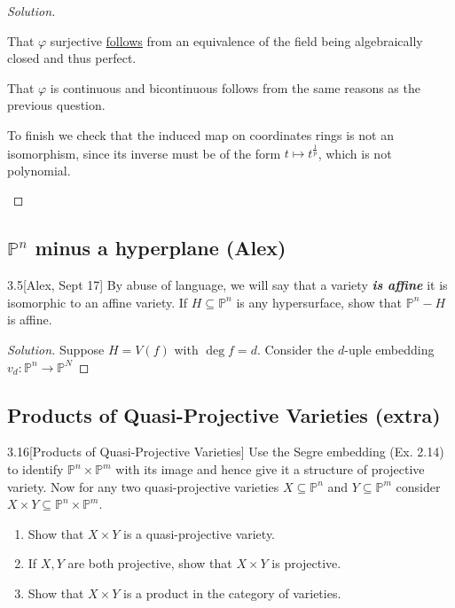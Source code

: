 \begin{proof}[Solution]
\begin{enumerate}[label=\alph*.]
	That $\varphi$ surjective \href{https://en.wikipedia.org/wiki/Perfect_field}{follows} from an equivalence of the field being algebraically closed and thus perfect.

	That $\varphi$ is continuous and bicontinuous follows from the same reasons as the previous question.

	To finish we check that the induced map on coordinates rings is not an isomorphism, since its inverse must be of the form $t\mapsto t^{\frac{1}{p}}$, which is not polynomial.

\end{enumerate}
\end{proof}

\subsection{$\mathbb{P}^n$ minus a hyperplane (Alex)}

\begin{manualexercise}{3.5}[Alex, Sept 17]
	By abuse of language, we will say that a variety \textit{\textbf{is affine}} it is isomorphic to an affine variety. If $H\subseteq \mathbb{P}^n$ is any hypersurface, show that $\mathbb{P}^n-H$ is affine.
\end{manualexercise}

\begin{proof}[Solution]\leavevmode
	Suppose $H=V(f)$ with  $\operatorname{deg}f=d$. Consider the $d$-uple embedding $v_d:\mathbb{P}^n\to \mathbb{P}^N$
\end{proof}

\subsection{Products of Quasi-Projective Varieties (extra)}

\begin{manualexercise}{3.16}[Products of Quasi-Projective Varieties]
	Use the Segre embedding (Ex. 2.14) to identify $\mathbb{P}^n\times\mathbb{P}^m$ with its image and hence give it a structure of projective variety. Now for any two quasi-projective varieties $X\subseteq\mathbb{P}^n$ and $Y\subseteq\mathbb{P}^m$ consider $X\times Y\subseteq\mathbb{P}^n\times\mathbb{P}^m$.
	\begin{enumerate}[label*=(\alph*)]
		\item Show that $X\times Y$ is a quasi-projective variety.
		\item If $X,Y$ are both projective, show that $X\times Y$ is projective.
		\item Show that $X\times Y$ is a product in the category of varieties.
	\end{enumerate}
\end{manualexercise}

